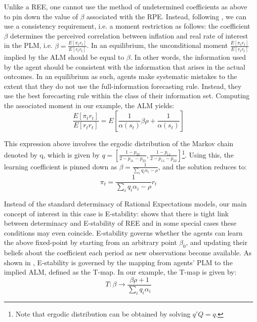 \documentclass[12pt,reqno]{article}
\numberwithin{equation}{section}
\begin{document}
\noindent
Unlike a REE, one cannot use the method of undetermined coefficients as above to pin down the value of $\beta$ associated with the RPE. Instead, following \cite{hommes2014behavioral}, we can use a consistency requirement, i.e. a moment restriction as follows: the coefficient $\beta$ determines the {perceived correlation} between inflation and real rate of interest in the PLM, i.e.   $\beta=\frac{E [\pi_t r_t]}{E[r_t r_t]} $. In an equilibrium, the unconditional moment $\frac{E [\pi_t r_t]}{E[r_t r_t]} $ implied by the ALM should be equal to $\beta$. In other words, the information used by the agent should be consistent with the information that arises in the actual outcomes. In an equilibrium as such, agents make systematic mistakes to the extent that they do not use the full-information forecasting rule. Instead, they use the best forecasting rule within the class of their information set.  Computing the associated moment in our example, the ALM yields: \\ 

$$\frac{ E[\pi_t r_t]}{E[r_t r_t]} = E[ \frac{1}{\alpha(s_t)} \beta \rho + \frac{1}{\alpha(s_t)}]$$

This expression above involves the ergodic distribution of the Markov chain denoted by q, which is given by  $ q= [ \frac{1-p_{22}}{2-p_{11}- p_{22}}, \frac{1-p_{11}}{2-p_{11}-p_{22}}] $\footnote{Note that ergodic distribution can be obtained by solving $ q' Q = q $.}. Using this, the learning coefficient is pinned down as $ \beta = \frac{1}{\sum_i q_i \alpha_i  -\rho } $, and the solution reduces to: \\

$$ \pi_t = \frac{1}{\sum_i q_i \alpha_i  -\rho} r_t $$

\noindent
Instead of the standard determinacy of Rational Expectations models, our main concept of interest in this case is E-stability: \cite{bullard2014does} shows that there is tight link between determinacy and E-stability of REE and in some special cases these conditions may even coincide. E-stability governs whether the agents can learn the above fixed-point by starting from an arbitrary point $\beta_0$, and updating their beliefs about the coefficient each period as new observations become available. As shown in \cite{evans2012learning}, E-stability is governed by the mapping from agents' PLM to the implied ALM, defined as the T-map. In our example, the T-map is given by: \\

$$ T: \beta \rightarrow \frac{\beta \rho + 1 }{\sum_i q_i \alpha_i} $$
\end{document}
